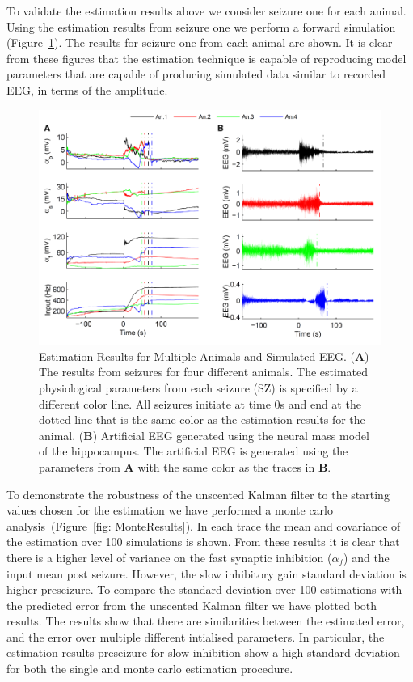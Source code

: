 To validate the estimation results above we consider seizure one for each animal. Using the estimation results from seizure one we perform a forward simulation (Figure~\ref{fig: SZComp}). The results for seizure one from each animal are shown. It is clear from these figures that the estimation technique is capable of reproducing model parameters that are capable of producing simulated data similar to recorded EEG, in terms of the amplitude.  

\begin{figure}[ht]
 	\centering
 		\includegraphics{fig/AnimalComp.pdf}
 	\caption{Estimation Results for Multiple Animals and Simulated EEG. (\textbf{A}) The results from seizures for four different animals. The estimated physiological parameters from each seizure (SZ) is specified by a different color line. All seizures initiate at time 0s and end at the dotted line that is the same color as the estimation results for the animal. (\textbf{B}) Artificial EEG generated using the neural mass model of the hippocampus. The artificial EEG is generated using the parameters from \textbf{A} with the same color as the traces in \textbf{B}.}
 	\label{fig: SZComp}
 \end{figure}

To demonstrate the robustness of the unscented Kalman filter to the starting values chosen for the estimation we have performed a monte carlo analysis~(Figure~\ref{fig: MonteResults}). In each trace the mean and covariance of the estimation over 100 simulations is shown. From these results it is clear that there is a higher level of variance on the fast synaptic inhibition ($\alpha_f$) and the input mean post seizure. However, the slow inhibitory gain standard deviation is higher preseizure. To compare the standard deviation over 100 estimations with the predicted error from the unscented Kalman filter we have plotted both results. The results show that there are similarities between the estimated error, and the error over multiple different intialised parameters. In particular, the estimation results preseizure for slow inhibition show a high standard deviation for both the single and monte carlo estimation procedure.

